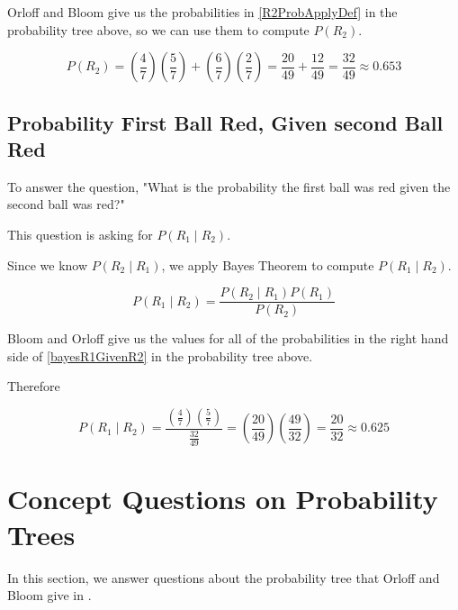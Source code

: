 \documentclass[a4paper,11pt]{article}
\begin{document}
Orloff and Bloom give us the probabilities in \ref{R2ProbApplyDef} in 
the probability tree above, so we can use them to compute 
$P\left( R_{2} \right)$.

\begin{equation} \label{R2PlugNumbers}
  P \left( R_{2} \right) = \left( \frac {4}{7} \right) 
    \left( \frac{5}{7} \right) +
    \left( \frac {6}{7} \right) \left( \frac{2}{7} \right)
  = \frac{20}{49} + \frac{12}{49} = \frac{32}{49} \approx 0.653
\end{equation}

\subsection{Probability First Ball Red, Given second Ball Red}

To answer the question, "What is the probability the first ball was red 
given the second ball was red?" \cite{slides3}

This question is asking for $P \left( R_{1} \mid R_{2} \right)$.

Since we know $P\left( R_{2} \mid R_{1} \right)$, we apply Bayes Theorem
to compute $P \left( R_{1} \mid R_{2} \right)$.

\begin{equation} \label{bayesR1GivenR2}
P \left( R_{1} \mid R_{2} \right) = 
  \frac{ P \left( R_{2} \mid R_{1} \right) P \left( R_{1} \right)}
    {P \left( R_{2} \right)}
\end{equation}

Bloom and Orloff give us the values for all of the probabilities in the
right hand side of \ref{bayesR1GivenR2} in the probability tree above.

Therefore 

\begin{equation} \label{bayesR1GivenR2}
P \left( R_{1} \mid R_{2} \right) = 
  \frac{ \left( \frac{4}{7} \right) \left( \frac{5}{7} \right)} 
    {\frac{32}{49}} 
  = \left( \frac{20}{49} \right) 
      \left( \frac{49}{32} \right)
  = \frac{20}{32} \approx 0.625
\end{equation}

\section{Concept Questions on Probability Trees}
In this section, we answer questions about the probability tree that
Orloff and Bloom give in \cite{slides3}.
\end{document}
